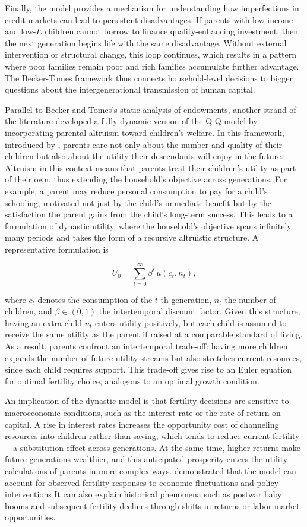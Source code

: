 \documentclass[]{AEA}
\begin{document}
Finally, the model provides a mechanism for understanding how
imperfections in credit markets can lead to persistent disadvantages. If
parents with low income and low-\(E\) children cannot borrow to finance
quality-enhancing investment, then the next generation begins life with
the same disadvantage. Without external intervention or structural
change, this loop continues, which results in a pattern where poor
families remain poor and rich families accumulate further advantage. The
Becker-Tomes framework thus connects household-level decisions to bigger
questions about the intergenerational transmission of human capital.

Parallel to Becker and Tomes's static analysis of endowments, another
strand of the literature developed a fully dynamic version of the Q-Q
model by incorporating parental altruism toward children's welfare. In
this framework, introduced by \citet{barro1989fertility}, parents care
not only about the number and quality of their children but also about
the utility their descendants will enjoy in the future. Altruism in this
context means that parents treat their children's utility as part of
their own, thus extending the household's objective across generations.
For example, a parent may reduce personal consumption to pay for a
child's schooling, motivated not just by the child's immediate benefit
but by the satisfaction the parent gains from the child's long-term
success. This leads to a formulation of dynastic utility, where the
household's objective spans infinitely many periods and takes the form
of a recursive altruistic structure. A representative formulation is

\[
U_{0} = \sum_{t=0}^{\infty} \beta^{t}\,u(c_{t}, n_{t}),
\]

where \(c_t\) denotes the consumption of the \(t\)-th generation,
\(n_t\) the number of children, and \(\beta \in (0,1)\) the
intertemporal discount factor. Given this structure, having an extra
child \(n_t\) enters utility positively, but each child is assumed to
receive the same utility as the parent if raised at a comparable
standard of living. As a result, parents confront an intertemporal
trade-off: having more children expands the number of future utility
streams but also stretches current resources, since each child requires
support. This trade-off gives rise to an Euler equation for optimal
fertility choice, analogous to an optimal growth condition.

An implication of the dynastic model is that fertility decisions are
sensitive to macroeconomic conditions, such as the interest rate or the
rate of return on capital. A rise in interest rates increases the
opportunity cost of channeling resources into children rather than
saving, which tends to reduce current fertility---a substitution effect
across generations. At the same time, higher returns make future
generations wealthier, and this anticipated prosperity enters the
utility calculations of parents in more complex ways.
\citet{barro1989fertility} demonstrated that the model can account for
observed fertility responses to economic fluctuations and policy
interventions It can also explain historical phenomena such as postwar
baby booms and subsequent fertility declines through shifts in returns
or labor‐market opportunities.
\end{document}

